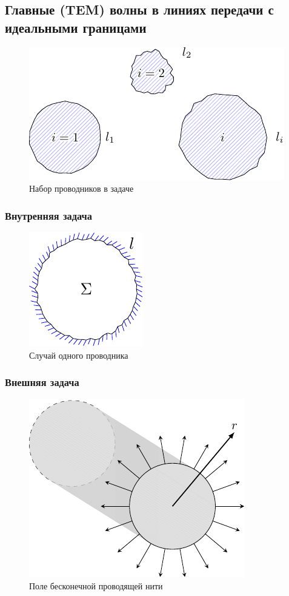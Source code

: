 \subsection{Главные (TEM) волны в линиях передачи с идеальными границами}
\begin{figure}[H]
	\centering
	\includegraphics[scale=1.5]{img/lect4_ris1}
	\caption{Набор проводников в задаче}
	\label{fig:lect4:1}
\end{figure}

\subsubsection{Внутренняя задача}
\begin{figure}[H]
	\centering
	\includegraphics[scale=1.5]{img/lect4_ris2}
	\caption{Случай одного проводника}
	\label{fig:lect4:2}
\end{figure}
\subsubsection{Внешняя задача}
\begin{figure}[H]
	\centering
	\includegraphics[scale=1.5]{img/lect4_ris3}
	\caption{Поле бесконечной проводящей нити}
	\label{fig:lect4:3}
\end{figure}

